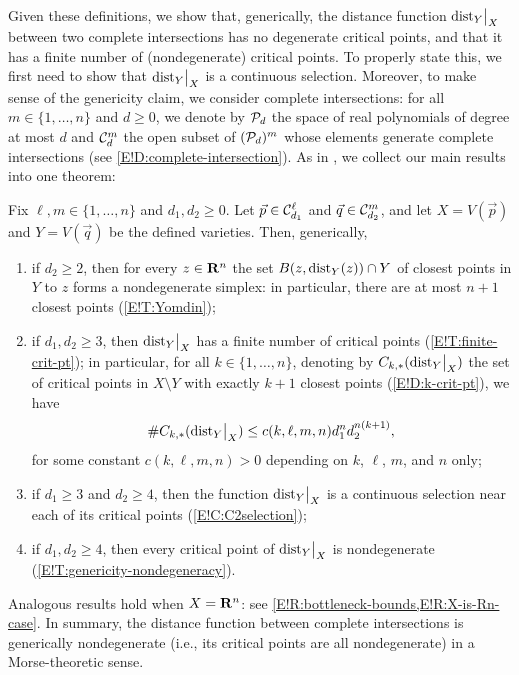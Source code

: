 Given these definitions, we show that, generically, the distance function $\mathord{\operatorname{dist}}_Y\big|_X$ between two complete intersections has no degenerate critical points, and that it has a finite number of (nondegenerate) critical points. To properly state this, we first need to show that $\mathord{\operatorname{dist}}_Y\big|_X$ is a continuous selection. Moreover, to make sense of the genericity claim, we consider complete intersections: for all $m \in \{1, \ldots, n\}$ and $d \geq 0$, we denote by $\mathcal{P}_d$ the space of real polynomials of degree at most $d$ and $\mathcal{C}_d^m$ the open subset of $(\mathcal{P}_d)^m$ whose elements generate complete intersections (see \cref{E!D:complete-intersection}). As in \cite{GLRS2025}, we collect our main results into one theorem:

\begin{theorem*}
  Fix $\ell, m \in \{1, \ldots, n\}$ and $d_1, d_2 \geq 0$. Let $\vec{p} \in \mathcal{C}_{d_1}^\ell$ and $\vec{q} \in \mathcal{C}_{d_2}^m$, and let $X = V(\vec{p})$ and $Y = V(\vec{q})$ be the defined varieties. Then, generically,
  \begin{enumerate}
  \item
    if $d_2 \geq 2$, then for every $z \in \mathbf{R}^n$ the set $B(z, \operatorname{dist}_Y(z)) \cap Y$ of closest points in $Y$ to $z$ forms a nondegenerate simplex: in particular, there are at most $n + 1$ closest points (\cref{E!T:Yomdin});
  \item
    if $d_1, d_2 \geq 3$, then $\mathord{\operatorname{dist}}_Y\big|_X$ has a finite number of critical points (\cref{E!T:finite-crit-pt}); in particular, for all $k \in \{1, \ldots, n\}$, denoting by $C_{k, *}(\mathord{\operatorname{dist}}_Y\big|_X)$ the set of critical points in $X \setminus Y$ with exactly $k + 1$ closest points (\cref{E!D:k-crit-pt}), we have
    \[
      \#C_{k, *}(\mathord{\operatorname{dist}}_Y\big|_X) \leq c(k, \ell, m, n) d_1^n d_2^{n (k + 1)},
    \]
    for some constant $c(k, \ell, m, n) > 0$ depending on $k$, $\ell$, $m$, and $n$ only;
  \item
    if $d_1 \geq 3$ and $d_2 \geq 4$, then the function $\mathord{\operatorname{dist}}_Y\big|_X$ is a continuous selection near each of its critical points (\cref{E!C:C2selection});
  \item
    if $d_1, d_2 \geq 4$, then every critical point of $\mathord{\operatorname{dist}}_Y\big|_X$ is nondegenerate (\cref{E!T:genericity-nondegeneracy}).
  \end{enumerate}
\end{theorem*}

Analogous results hold when $X = \mathbf{R}^n$: see \cref{E!R:bottleneck-bounds,E!R:X-is-Rn-case}.
In summary, the distance function between complete intersections is generically nondegenerate (i.e., its critical points are all nondegenerate) in a Morse-theoretic sense.

